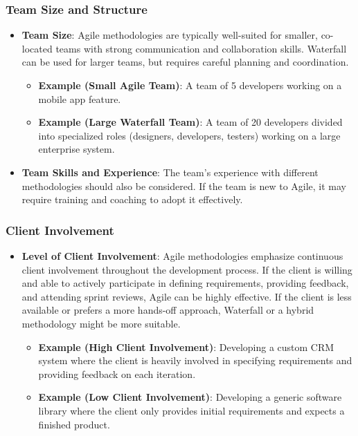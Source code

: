 \subsubsection{Team Size and Structure}

\begin{itemize}
  \item \textbf{Team Size}: Agile methodologies are typically well-suited for smaller, co-located teams with strong communication and collaboration skills. Waterfall can be used for larger teams, but requires careful planning and coordination.
        \begin{itemize}
          \item \textbf{Example (Small Agile Team)}: A team of 5 developers working on a mobile app feature.
          \item \textbf{Example (Large Waterfall Team)}: A team of 20 developers divided into specialized roles (designers, developers, testers) working on a large enterprise system.
        \end{itemize}
  \item \textbf{Team Skills and Experience}: The team's experience with different methodologies should also be considered. If the team is new to Agile, it may require training and coaching to adopt it effectively.
\end{itemize}

\subsubsection{Client Involvement}

\begin{itemize}
  \item \textbf{Level of Client Involvement}: Agile methodologies emphasize continuous client involvement throughout the development process. If the client is willing and able to actively participate in defining requirements, providing feedback, and attending sprint reviews, Agile can be highly effective. If the client is less available or prefers a more hands-off approach, Waterfall or a hybrid methodology might be more suitable.
        \begin{itemize}
          \item \textbf{Example (High Client Involvement)}: Developing a custom CRM system where the client is heavily involved in specifying requirements and providing feedback on each iteration.
          \item \textbf{Example (Low Client Involvement)}: Developing a generic software library where the client only provides initial requirements and expects a finished product.
        \end{itemize}
\end{itemize}

